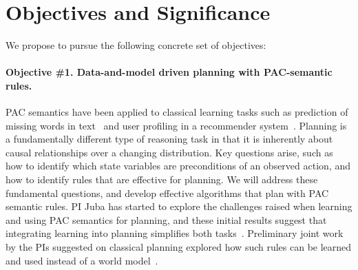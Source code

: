 \documentclass[12pt]{article}
\begin{document}
 

\section{Objectives and Significance}

We propose to pursue the following concrete set of objectives:
\vspace{-0.35cm}

\paragraph{Objective \#1. Data-and-model driven planning with PAC-semantic rules.}
PAC semantics have been applied to classical learning tasks such as prediction of missing words in text~\cite{michael2008first} and user profiling in a recommender system~\cite{semeraro2009knowledge}. Planning is a fundamentally different type of reasoning task in that it is inherently about causal relationships over a changing distribution. Key questions arise, such as how to identify which state variables are preconditions of an observed action, and how to identify rules that are effective for planning. We will address these fundamental questions, and 
develop effective algorithms that plan with PAC semantic rules. PI Juba has started to explore the challenges raised when learning and using PAC semantics for planning, and these initial results suggest that integrating learning into planning simplifies both tasks~\cite{juba2016jmlr}. Preliminary joint work by the PIs suggested on classical planning explored how such rules can be learned and used instead of a world model~\cite{stern2017efficientAndSafe}. 
\end{document}
